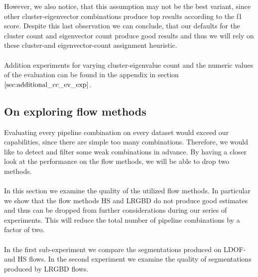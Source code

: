 However, we also notice, that this assumption may not be the best variant, since other cluster-eigenvector combinations produce top results according to the f1 score. Despite this last observation we can conclude, that our defaults for the cluster count and eigenvector count produce good results and thus we will rely on these cluster-and eigenvector-count assignment heuristic. \\ \\
Addition experiments for varying cluster-eigenvalue count and the numeric values of the evaluation can be found in the appendix in section $\ref{sec:additional_cc_ev_exp}$.


\subsection{On exploring flow methods}
Evaluating every pipeline combination on every dataset would exceed our capabilities, since there are simple too many combinations. Therefore, we would like to detect and filter some weak combinations in advance. By having a closer look at the performance on the flow methods, we will be able to drop two methods. \\ \\
In this section we examine the quality of the utilized flow methods. In particular we show that the flow methods HS and LRGBD do not produce good estimates and thus can be dropped from further considerations during our series of experiments. This will reduce the total number of pipeline combinations by a factor of two. \\ \\
In the first sub-experiment we compare the segmentations produced on LDOF-and HS flows. In the second experiment we examine the quality of segmentations produced by LRGBD flows.

